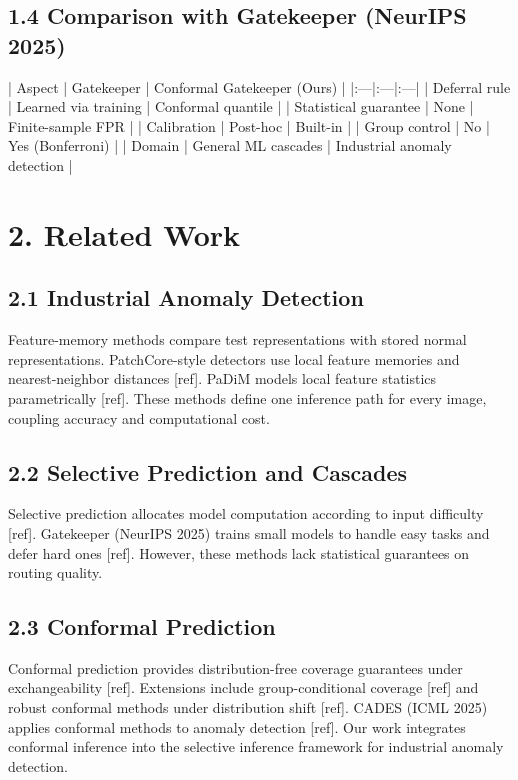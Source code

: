 \documentclass[10pt]{article}
\begin{document}
\subsection{1.4 Comparison with Gatekeeper (NeurIPS 2025)}

| Aspect | Gatekeeper | Conformal Gatekeeper (Ours) |
|:---|:---|:---|
| Deferral rule | Learned via training | Conformal quantile |
| Statistical guarantee | None | Finite-sample FPR |
| Calibration | Post-hoc | Built-in |
| Group control | No | Yes (Bonferroni) |
| Domain | General ML cascades | Industrial anomaly detection |

\section{2. Related Work}

\subsection{2.1 Industrial Anomaly Detection}

Feature-memory methods compare test representations with stored normal representations. PatchCore-style detectors use local feature memories and nearest-neighbor distances [ref]. PaDiM models local feature statistics parametrically [ref]. These methods define one inference path for every image, coupling accuracy and computational cost.

\subsection{2.2 Selective Prediction and Cascades}

Selective prediction allocates model computation according to input difficulty [ref]. Gatekeeper (NeurIPS 2025) trains small models to handle easy tasks and defer hard ones [ref]. However, these methods lack statistical guarantees on routing quality.

\subsection{2.3 Conformal Prediction}

Conformal prediction provides distribution-free coverage guarantees under exchangeability [ref]. Extensions include group-conditional coverage [ref] and robust conformal methods under distribution shift [ref]. CADES (ICML 2025) applies conformal methods to anomaly detection [ref]. Our work integrates conformal inference into the selective inference framework for industrial anomaly detection.
\end{document}
